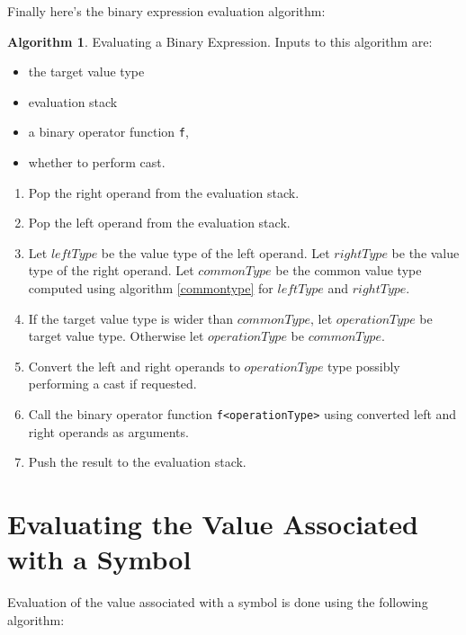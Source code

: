 \documentclass[a4paper,oneside,11pt]{book}
\theoremstyle{definition}
\newtheorem{algo}{Algorithm}[section]
\begin{document}
Finally here's the binary expression evaluation algorithm:

\begin{algo}\label{binaryexpreval} Evaluating a Binary Expression.
Inputs to this algorithm are:
\begin{itemize}
\item
the target value type
\item
evaluation stack
\item
a binary operator function \verb|f|,
\item
whether to perform cast.
\end{itemize}

\begin{enumerate}
\item
Pop the right operand from the evaluation stack.
\item
Pop the left operand from the evaluation stack.
\item
Let $leftType$ be the value type of the left operand.
Let $rightType$ be the value type of the right operand.
Let $commonType$ be the common value type computed using algorithm \ref{commontype} for $leftType$ and $rightType$.
\item
If the target value type is wider than $commonType$, let $operationType$ be target value type.
Otherwise let $operationType$ be $commonType$.
\item
Convert the left and right operands to $operationType$ type possibly performing a cast if requested.
\item
Call the binary operator function \verb|f<operationType>| using converted left and right operands as arguments.
\item
Push the result to the evaluation stack.
\end{enumerate}
\end{algo}

\section{Evaluating the Value Associated with a Symbol}

Evaluation of the value associated with a symbol is done using the following algorithm:
\end{document}
